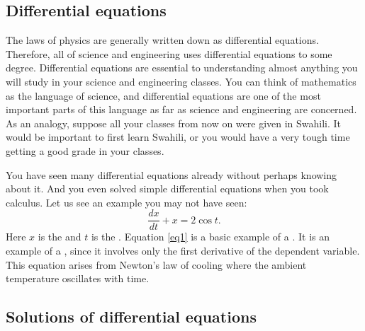 
\subsection{Differential equations}

The laws of physics are generally written down as differential
equations.  Therefore, all of science and engineering uses
differential equations to some degree.
Differential equations are essential to understanding almost anything you will
study in your science and engineering classes.
You can think of mathematics as the language of science, and
differential equations are one of the most important parts of this
language as far as science and engineering are concerned.  As an analogy,
suppose all your classes from now on were given in Swahili.  
It would be important to first learn Swahili, or you would have a very
tough time getting a good grade in your classes.

You have seen many
differential equations already without perhaps knowing about it.
And you even solved simple
differential equations when you took calculus.
Let us see an example you may not have seen:
\begin{equation} \label{eq1}
\frac{dx}{dt} + x = 2 \cos t .
\end{equation}
Here $x$ is the \emph{} and $t$ is the
\emph{}.
Equation \eqref{eq1}
is a basic example of a \emph{}.  It
is an example of a \emph{}, since
it involves only the first derivative of the dependent variable.  This 
equation arises from Newton's law of cooling where the ambient
temperature oscillates with time.

\subsection{Solutions of differential equations}

